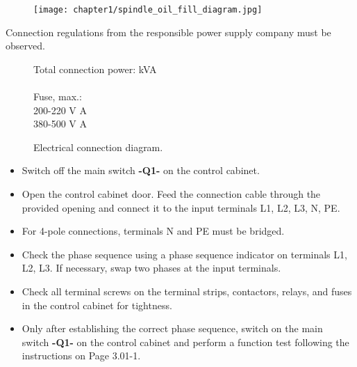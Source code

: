 \begin{figure}[h!]
    \centering
    \texttt{[image: chapter1/spindle\_oil\_fill\_diagram.jpg]} %
    \caption{}
\end{figure}



Connection regulations from the responsible power supply company must be observed.

\begin{figure}[htp] %
    \centering
    \begin{minipage}[t]{.4\linewidth} %
        \centering
        \caption{Electrical connection diagram.} %
        \label{fig:electrical_connection} %
    \end{minipage}%
    \hfill %
    \begin{minipage}[t]{\dimexpr\textwidth-8cm\relax} %
        \vspace{0pt} %
        Total connection power:  kVA \\\\
        Fuse, max.: \\
        200-220 V  A \\
        380-500 V  A
    \end{minipage}
\end{figure}

\begin{itemize}
    \item Switch off the main switch \textbf{-Q1-} on the control cabinet.
    \item Open the control cabinet door. Feed the connection cable through the \\provided opening and connect it to the input terminals L1, L2, L3, N, PE.
    \item For 4-pole connections, terminals N and PE must be bridged.
    \item Check the phase sequence using a phase sequence indicator on terminals L1, L2, L3. If necessary, swap two phases at the input terminals.
    \item Check all terminal screws on the terminal strips, contactors, relays, and fuses in the control cabinet for tightness.
    \item Only after establishing the correct phase sequence, switch on the main \\switch \textbf{-Q1-} on the control cabinet and perform a function test following the instructions on Page 3.01-1.
\end{itemize}

